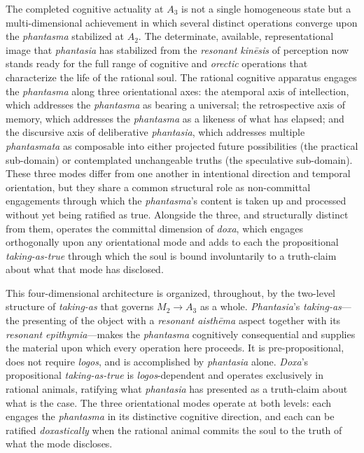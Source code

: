 The completed cognitive actuality at $A_3$ is not a single homogeneous state but a multi-dimensional achievement in which several distinct operations converge upon the \textit{phantasma} stabilized at $A_2$. The determinate, available, representational image that \textit{phantasia} has stabilized from the \textit{resonant kinēsis} of perception now stands ready for the full range of cognitive and \textit{orectic} operations that characterize the life of the rational soul. The rational cognitive apparatus engages the \textit{phantasma} along three orientational axes: the atemporal axis of intellection, which addresses the \textit{phantasma} as bearing a universal; the retrospective axis of memory, which addresses the \textit{phantasma} as a likeness of what has elapsed; and the discursive axis of deliberative \textit{phantasia}, which addresses multiple \textit{phantasmata} as composable into either projected future possibilities (the practical sub-domain) or contemplated unchangeable truths (the speculative sub-domain). These three modes differ from one another in intentional direction and temporal orientation, but they share a common structural role as non-committal engagements through which the \textit{phantasma}'s content is taken up and processed without yet being ratified as true. Alongside the three, and structurally distinct from them, operates the committal dimension of \textit{doxa}, which engages orthogonally upon any orientational mode and adds to each the propositional \textit{taking-as-true} through which the soul is bound involuntarily to a truth-claim about what that mode has disclosed.

This four-dimensional architecture is organized, throughout, by the two-level structure of \textit{taking-as} that governs $M_2 \rightarrow A_3$ as a whole. \textit{Phantasia}'s \textit{taking-as}---the presenting of the object with a \textit{resonant aisthēma} aspect together with its \textit{resonant epithymia}---makes the \textit{phantasma} cognitively consequential and supplies the material upon which every operation here proceeds. It is pre-propositional, does not require \textit{logos}, and is accomplished by \textit{phantasia} alone. \textit{Doxa}'s propositional \textit{taking-as-true} is \textit{logos}-dependent and operates exclusively in rational animals, ratifying what \textit{phantasia} has presented as a truth-claim about what is the case. The three orientational modes operate at both levels: each engages the \textit{phantasma} in its distinctive cognitive direction, and each can be ratified \textit{doxastically} when the rational animal commits the soul to the truth of what the mode discloses. 

